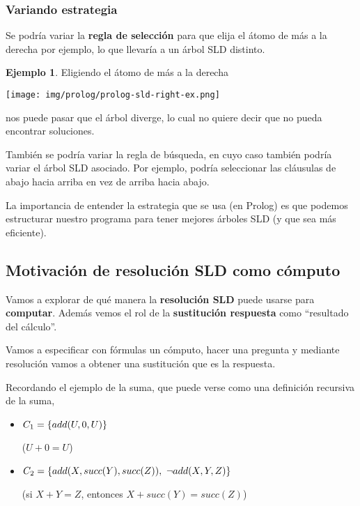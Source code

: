 \documentclass{report}
\theoremstyle{definition} %
\newtheorem*{example*}{Ejemplo}
\begin{document}
\subsubsection{Variando estrategia}

Se podría variar la \textbf{regla de selección} para que elija el átomo de más a
la derecha por ejemplo, lo que llevaría a un árbol SLD distinto.

\begin{example*} Eligiendo el átomo de más a la derecha
    \begin{center}
        \texttt{[image: img/prolog/prolog-sld-right-ex.png]}
    \end{center}

    nos puede pasar que el árbol diverge, lo cual no quiere decir que no pueda
    encontrar soluciones.
\end{example*}

También se podría variar la regla de búsqueda, en cuyo caso también podría
variar el árbol SLD asociado. Por ejemplo, podría seleccionar las cláusulas de
abajo hacia arriba en vez de arriba hacia abajo.

La importancia de entender la estrategia que se usa (en Prolog) es que podemos
estructurar nuestro programa para tener mejores árboles SLD (y que sea más
eficiente).

\subsection{Motivación de resolución SLD como cómputo}

Vamos a explorar de qué manera la \textbf{resolución SLD} puede usarse para
\textbf{computar}. Además vemos el rol de la \textbf{sustitución respuesta} como
``resultado del cálculo''.

Vamos a especificar con fórmulas un cómputo, hacer una pregunta y mediante
resolución vamos a obtener una sustitución que es la respuesta.

Recordando el ejemplo de la suma, que puede verse como una definición recursiva
de la suma,

\begin{itemize}
    \item $C_1 = \{ add(U, 0, U) \}$ 

    ($U + 0 = U$)
    \item $C_2 = \set{add(X, succ(Y), succ(Z)),\ \neg add(X, Y, Z)}$

    (si $X+Y = Z$, entonces $X + succ(Y) = succ(Z)$)
\end{itemize}
\end{document}
